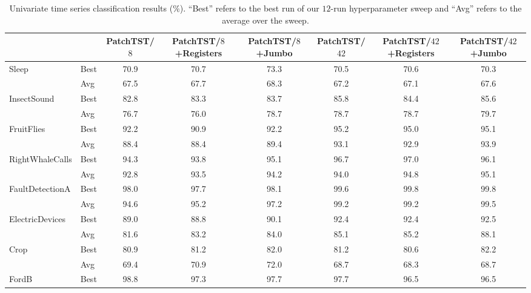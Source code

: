 \begin{table}[t]
    \centering
    \footnotesize
    \setlength{\tabcolsep}{2pt}
    \caption{Univariate time series classification results ($\%$). ``Best'' refers to the best run of our $12$-run hyperparameter sweep and ``Avg'' refers to the average over the sweep.}
    \label{tab:all_time_uni}
    \begin{tabular}{llcccccc} 
        \toprule
        & & PatchTST/$8$ & \makecell{PatchTST/$8$\\+Registers} & \makecell{PatchTST/$8$\\+Jumbo} & PatchTST/$42$ & \makecell{PatchTST/$42$\\+Registers} & \makecell{PatchTST/$42$\\+Jumbo} \\
         \midrule
         \multirow{2}{*}{Sleep} & Best & 70.9&	70.7&	73.3&	70.5&	70.6&	70.3\\
                                   & Avg  & 67.5&	67.7&	68.3&	67.2&	67.1&	67.6 \\
         \multirow{2}{*}{InsectSound} & Best & 82.8&	83.3&	83.7&	85.8&	84.4&	85.6 \\
                                       & Avg  & 76.7&	76.0&	78.7&	78.7&	78.7&	79.7 \\
         \multirow{2}{*}{FruitFlies} & Best & 92.2&	90.9&	92.2&	95.2&	95.0&	95.1\\
                                   & Avg  & 88.4&	88.4&	89.4&	93.1&	92.9&	93.9 \\
         \multirow{2}{*}{RightWhaleCalls} & Best & 94.3&	93.8&	95.1&	96.7&	97.0&	96.1 \\
                                       & Avg  & 92.8&	93.5&	94.2&	94.0&	94.8&	95.1\\
         \multirow{2}{*}{FaultDetectionA} & Best & 98.0&	97.7&	98.1&	99.6&	99.8&	99.8\\
                                   & Avg  & 94.6&	95.2&	97.2&	99.2&	99.2&	99.5\\
         \multirow{2}{*}{ElectricDevices} & Best & 89.0&	88.8&	90.1&	92.4&	92.4&	92.5 \\
                                       & Avg  & 81.6&	83.2&	84.0&	85.1&	85.2&	88.1 \\
         \multirow{2}{*}{Crop} & Best & 80.9&	81.2&	82.0&	81.2&	80.6&	82.2\\
                                   & Avg  & 69.4&	70.9&	72.0&	68.7&	68.3&	68.7 \\
         \multirow{2}{*}{FordB} & Best & 98.8&	97.3&	97.7&	97.7&	96.5&	96.5 \\

\end{tabular}
\end{table}
